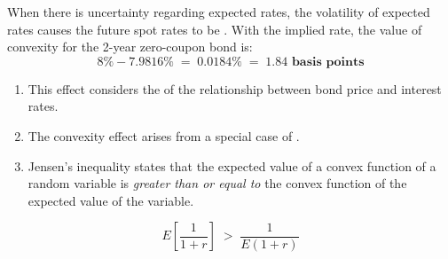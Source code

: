 \begin{mrkeybox}[title={Impact of volatility}]
When there is uncertainty regarding expected rates, the volatility of expected rates causes the
future spot rates to be . With the implied rate, the value of convexity for the
2-year zero-coupon bond is:
\[ 8\% - 7.9816\% \;=\; 0.0184\% \;=\; \mathbf{1.84 \text{ basis points}} \]
\end{mrkeybox}


\begin{mrdefbox}[title={The convexity effect}]
\begin{enumerate}[label=\textbf{\alph*)}]
\item This effect considers the  of the relationship between bond price and
      interest rates.
\item The convexity effect arises from a special case of .
\item Jensen's inequality states that the expected value of a convex function of a random
      variable is \textit{greater than or equal to} the convex function of the expected value of
      the variable.
\end{enumerate}
\end{mrdefbox}

\begin{mrfmlbox}
\[ E\!\left[ \frac{1}{1+r} \right] \;>\; \frac{1}{E(1+r)} \]
\end{mrfmlbox}

